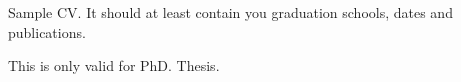Sample CV. It should at least contain you graduation schools, dates and publications.

This is only valid for PhD. Thesis.